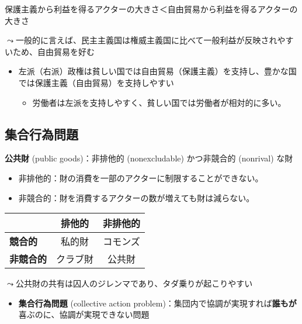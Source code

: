 \documentclass[
  xelatex,
  ja=standard]{bxjsarticle}
\providecommand{\tightlist}{%
  \setlength{\itemsep}{0pt}\setlength{\parskip}{0pt}}\usepackage{longtable,booktabs,array}
\begin{document}
保護主義から利益を得るアクターの大きさ＜自由貿易から利益を得るアクターの大きさ

\(\leadsto\)一般的に言えば、民主主義国は権威主義国に比べて一般利益が反映されやすいため、自由貿易を好む\citep{milner2005, kono2006}

\begin{itemize}
\tightlist
\item
  左派（右派）政権は貧しい国では自由貿易（保護主義）を支持し、豊かな国では保護主義（自由貿易）を支持しやすい\citep{dutt2002}

  \begin{itemize}
  \tightlist
  \item
    労働者は左派を支持しやすく、貧しい国では労働者が相対的に多い。
  \end{itemize}
\end{itemize}

\hypertarget{ux96c6ux5408ux884cux70baux554fux984c}{%
\subsection{集合行為問題}\label{ux96c6ux5408ux884cux70baux554fux984c}}

\textbf{公共財} (public goods)：非排他的 (nonexcludable) かつ非競合的
(nonrival) な財

\begin{itemize}
\tightlist
\item
  非排他的：財の消費を一部のアクターに制限することができない。
\item
  非競合的：財を消費するアクターの数が増えても財は減らない。
\end{itemize}

\begin{longtable}[]{@{}lcc@{}}
\toprule\noalign{}
& \textbf{排他的} & \textbf{非排他的} \\
\midrule\noalign{}
\endhead
\bottomrule\noalign{}
\endlastfoot
\textbf{競合的} & 私的財 & コモンズ \\
\textbf{非競合的} & クラブ財 & 公共財 \\
\end{longtable}

\(\leadsto\)公共財の共有は囚人のジレンマであり、タダ乗りが起こりやすい

\begin{itemize}
\tightlist
\item
  \textbf{集合行為問題} (collective action
  problem)：集団内で協調が実現すれば\textbf{誰もが}喜ぶのに、協調が実現できない問題
\end{itemize}
\end{document}
